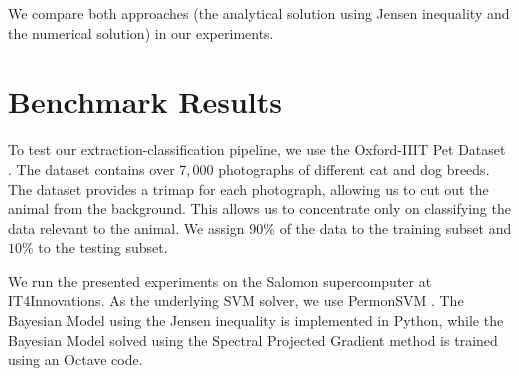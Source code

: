 \documentclass{aip-cp}
\begin{document}
We compare both approaches (the analytical solution using Jensen inequality and the numerical solution) in our experiments.

\section{Benchmark Results}
To test our extraction-classification pipeline, we use the Oxford-IIIT Pet Dataset \cite{parkhi12a}. The dataset contains over $7,000$ photographs of different cat and dog breeds. The dataset provides a trimap for each photograph, allowing us to cut out the animal from the background. This allows us to concentrate only on classifying the data relevant to the animal. We assign $90\%$ of the data to the training subset and $10\%$ to the testing subset.

We run the presented experiments on the Salomon supercomputer \cite{Salomon-WWW-17} at IT4Innovations. As the underlying SVM solver, we use PermonSVM \cite{permonSVM}. The Bayesian Model using the Jensen inequality is implemented in Python, while the Bayesian Model solved using the Spectral Projected Gradient method is trained using an Octave code.
\end{document}
